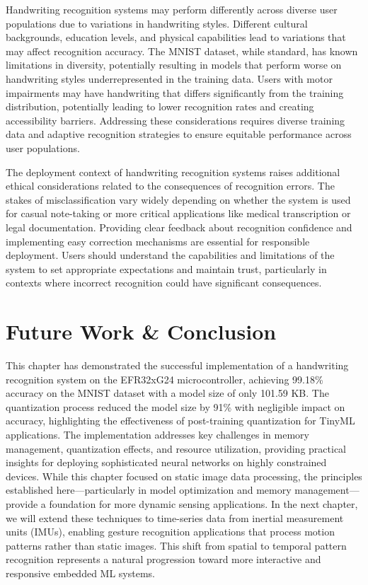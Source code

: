 \documentclass[
  9pt,
  letterpaper,
  abstract,
  titlepage]{scrbook}
\begin{document}
Handwriting recognition systems may perform differently across diverse
user populations due to variations in handwriting styles. Different
cultural backgrounds, education levels, and physical capabilities lead
to variations that may affect recognition accuracy. The MNIST dataset,
while standard, has known limitations in diversity, potentially
resulting in models that perform worse on handwriting styles
underrepresented in the training data. Users with motor impairments may
have handwriting that differs significantly from the training
distribution, potentially leading to lower recognition rates and
creating accessibility barriers. Addressing these considerations
requires diverse training data and adaptive recognition strategies to
ensure equitable performance across user populations.

The deployment context of handwriting recognition systems raises
additional ethical considerations related to the consequences of
recognition errors. The stakes of misclassification vary widely
depending on whether the system is used for casual note-taking or more
critical applications like medical transcription or legal documentation.
Providing clear feedback about recognition confidence and implementing
easy correction mechanisms are essential for responsible deployment.
Users should understand the capabilities and limitations of the system
to set appropriate expectations and maintain trust, particularly in
contexts where incorrect recognition could have significant
consequences.

\section{Future Work \& Conclusion}\label{future-work-conclusion}

This chapter has demonstrated the successful implementation of a
handwriting recognition system on the EFR32xG24 microcontroller,
achieving 99.18\% accuracy on the MNIST dataset with a model size of
only 101.59 KB. The quantization process reduced the model size by 91\%
with negligible impact on accuracy, highlighting the effectiveness of
post-training quantization for TinyML applications. The implementation
addresses key challenges in memory management, quantization effects, and
resource utilization, providing practical insights for deploying
sophisticated neural networks on highly constrained devices. While this
chapter focused on static image data processing, the principles
established here---particularly in model optimization and memory
management---provide a foundation for more dynamic sensing applications.
In the next chapter, we will extend these techniques to time-series data
from inertial measurement units (IMUs), enabling gesture recognition
applications that process motion patterns rather than static images.
This shift from spatial to temporal pattern recognition represents a
natural progression toward more interactive and responsive embedded ML
systems.
\end{document}
